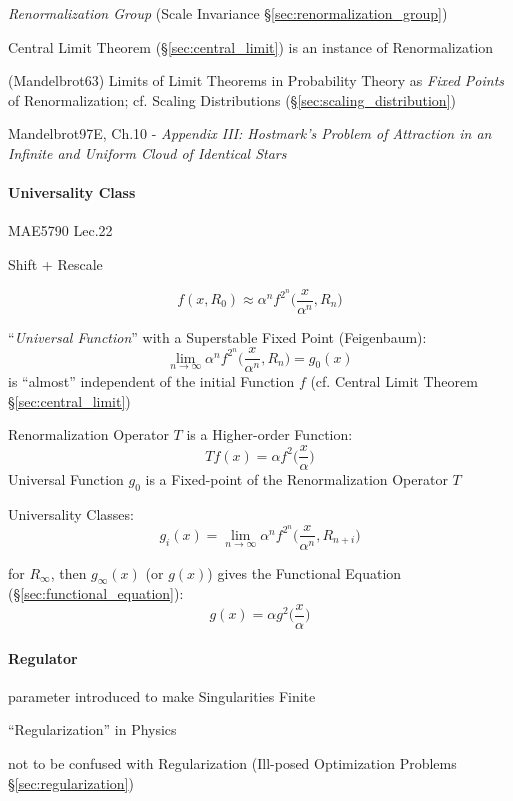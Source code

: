 {\fist \emph{Renormalization Group} (Scale Invariance
\S\ref{sec:renormalization_group})

\fist Central Limit Theorem (\S\ref{sec:central_limit}) is an instance
of Renormalization

(Mandelbrot63) Limits of Limit Theorems in Probability Theory as \emph{Fixed
  Points} of Renormalization; cf. Scaling Distributions
(\S\ref{sec:scaling_distribution})

Mandelbrot97E, Ch.10 - \emph{Appendix III: Hostmark's Problem of Attraction in
an Infinite and Uniform Cloud of Identical Stars}



\paragraph{Universality Class}\label{sec:universality_class}\hfill

MAE5790 Lec.22

Shift + Rescale

\[
  f(x, R_0) \approx \alpha^n f^{2^n}\big(\frac{x}{\alpha^n}, R_n\big)
\]

``\emph{Universal Function}'' with a Superstable Fixed Point (Feigenbaum):
\[
  \lim_{n\to\infty} \alpha^n f^{2^n}\big(\frac{x}{\alpha^n}, R_n\big) = g_0(x)
\]
is ``almost'' independent of the initial Function $f$ (cf. Central Limit
Theorem \S\ref{sec:central_limit})

Renormalization Operator $T$ is a Higher-order Function:
\[
  T f(x) = \alpha f^2\big(\frac{x}{\alpha}\big)
\]
Universal Function $g_0$ is a Fixed-point of the Renormalization Operator $T$

Universality Classes:
\[
  g_i(x) =
    \lim_{n\to\infty} \alpha^n f^{2^n}\big(\frac{x}{\alpha^n}, R_{n+i}\big)
\]

for $R_\infty$, then $g_\infty(x)$ (or $g(x)$) gives the Functional Equation
(\S\ref{sec:functional_equation}):
\[
  g(x) = \alpha g^2\big(\frac{x}{\alpha}\big)
\]



\paragraph{Regulator}\label{sec:regulator}\hfill

parameter introduced to make Singularities Finite

``Regularization'' in Physics

not to be confused with Regularization (Ill-posed Optimization Problems
\S\ref{sec:regularization})



}
